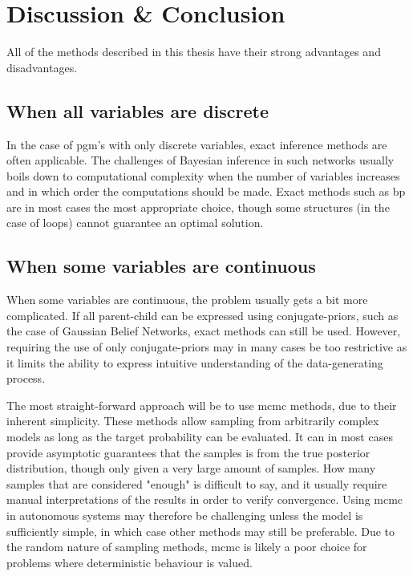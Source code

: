 \chapter{Discussion \& Conclusion}\label{chap:discussion}

All of the methods described in this thesis have their strong advantages and disadvantages. 

\section{When all variables are discrete}
In the case of \acrshort{pgm}'s with only discrete variables, exact inference methods are often applicable. The challenges of Bayesian inference in such networks usually boils down to computational complexity when the number of variables increases and in which order the computations should be made. Exact methods such as \acrshort{bp} are in most cases the most appropriate choice, though some structures (in the case of loops) cannot guarantee an optimal solution. 

\section{When some variables are continuous}
When some variables are continuous, the problem usually gets a bit more complicated. If all parent-child can be expressed using conjugate-priors, such as the case of Gaussian Belief Networks, exact methods can still be used. However, requiring the use of only conjugate-priors may in many cases be too restrictive as it limits the ability to express intuitive understanding of the data-generating process. 

The most straight-forward approach will be to use \acrshort{mcmc} methods, due to their inherent simplicity. These methods allow sampling from arbitrarily complex models as long as the target probability can be evaluated. It can in most cases provide asymptotic guarantees that the samples is from the true posterior distribution, though only given a very large amount of samples. How many samples that are considered "enough" is difficult to say, and it usually require manual interpretations of the results in order to verify convergence. Using \acrshort{mcmc} in autonomous systems may therefore be challenging unless the model is sufficiently simple, in which case other methods may still be preferable. Due to the random nature of sampling methods, \acrshort{mcmc} is likely a poor choice for problems where deterministic behaviour is valued. 

